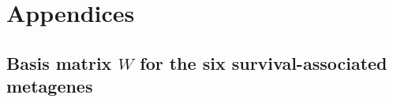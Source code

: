 \documentclass[dissertation.tex]{subfiles}
\begin{document}
\appendix
\section{Appendices}
\subsection{Basis matrix $W$ for the six survival-associated metagenes}
\label{app:sig_w_matrix}

\end{document}
